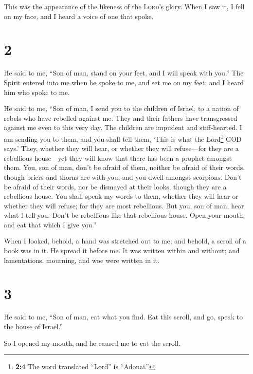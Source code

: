 This was the appearance of the likeness of the \textsc{Lord}'s glory.
When I saw it, I fell on my face, and I heard a voice of one that spoke.

\hypertarget{section-1}{%
\section{2}\label{section-1}}

 He said to me, ``Son of man, stand on your feet, and I
will speak with you.''  The Spirit entered into me when he
spoke to me, and set me on my feet; and I heard him who spoke to me.

 He said to me, ``Son of man, I send you to the children
of Israel, to a nation of rebels who have rebelled against me. They and
their fathers have transgressed against me even to this very day.
 The children are impudent and stiff-hearted. I am sending
you to them, and you shall tell them, `This is what the Lord\footnote{\textbf{2:4}
  The word translated ``Lord'' is ``Adonai.''} GOD says.' 
They, whether they will hear, or whether they will refuse---for they are
a rebellious house---yet they will know that there has been a prophet
amongst them.  You, son of man, don't be afraid of them,
neither be afraid of their words, though briers and thorns are with you,
and you dwell amongst scorpions. Don't be afraid of their words, nor be
dismayed at their looks, though they are a rebellious house.
 You shall speak my words to them, whether they will hear
or whether they will refuse; for they are most rebellious.
 But you, son of man, hear what I tell you. Don't be
rebellious like that rebellious house. Open your mouth, and eat that
which I give you.''

 When I looked, behold, a hand was stretched out to me;
and behold, a scroll of a book was in it.  He spread it
before me. It was written within and without; and lamentations,
mourning, and woe were written in it.

\hypertarget{section-2}{%
\section{3}\label{section-2}}

 He said to me, ``Son of man, eat what you find. Eat this
scroll, and go, speak to the house of Israel.''

 So I opened my mouth, and he caused me to eat the scroll.


